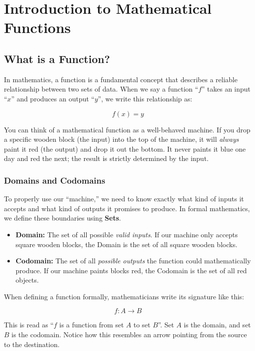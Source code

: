 \chapter{Introduction to Mathematical Functions}

\section{What is a Function?}

In mathematics, a function is a fundamental concept that describes a reliable relationship between two sets of data. When we say a function ``$f$'' takes an input ``$x$'' and produces an output ``$y$'', we write this relationship as:

\[ f(x) = y \]

You can think of a mathematical function as a well-behaved machine. If you drop a specific wooden block (the input) into the top of the machine, it will \textit{always} paint it red (the output) and drop it out the bottom. It never paints it blue one day and red the next; the result is strictly determined by the input.

\subsection{Domains and Codomains}

To properly use our ``machine,'' we need to know exactly what kind of inputs it accepts and what kind of outputs it promises to produce. In formal mathematics, we define these boundaries using \textbf{Sets}.

\begin{itemize}
    \item \textbf{Domain:} The set of all possible \textit{valid inputs}. If our machine only accepts square wooden blocks, the Domain is the set of all square wooden blocks.
    \item \textbf{Codomain:} The set of all \textit{possible outputs} the function could mathematically produce. If our machine paints blocks red, the Codomain is the set of all red objects.
\end{itemize}

When defining a function formally, mathematicians write its signature like this:

\[ f : A \rightarrow B \]

This is read as ``$f$ is a function from set $A$ to set $B$''. Set $A$ is the domain, and set $B$ is the codomain. Notice how this resembles an arrow pointing from the source to the destination.

